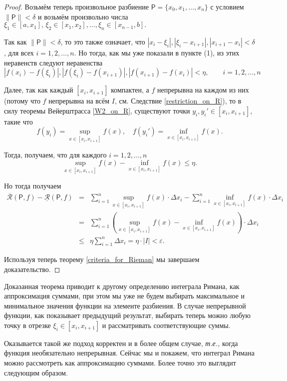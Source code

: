 \begin{proof}
Возьмём теперь произвольное разбиение $\mathsf{P} = \{x_0,x_1,\ldots, x_n\}$ с условием $\|\mathsf{P}\| < \delta$ и возьмём произвольно числа $\xi_1 \in [a,x_1],\, \xi_2 \in [x_1,x_2], \ldots, \xi_n \in [x_{n-1},b].$

Так как $\| \mathsf{P}\| < \delta$, то это также означает, что $|x_i - \xi_i|, |\xi_i-x_{i+1}|, |x_{i+1} - x_i| < \delta$, для всех $i=1,2,\ldots, n$. Но тогда, как мы уже показали в пункте (1), из этих неравенств следуют неравенства 
\[
 |f(x_i) - f(\xi_i)|, |f(\xi_i) - f(x_{i+1})|, |f(x_{i+1}) - f(x_i)| < \eta, \qquad i =1,2, \ldots, n
\]

Далее, так как каждый $[x_i,x_{i+1}]$ компактен, а $f$ непрерывна на каждом из них (потому что $f$ непрерывна на всём $I$, см. Следствие \ref{restriction_on_R}), то в силу теоремы Вейерштрасса \ref{W2_on_R}, существуют точки $y_i,y_i' \in [x_i,x_{i+1}]$, такие что
\[
f(y_i) =  \sup_{x \in [x_i, x_{i+1}]}f(x),\quad f(y_i') = \inf_{x \in [x_i,x_{i+1}]}f(x).
\]

Тогда, получаем, что для каждого $i=1,2,\ldots, n$
\[
 \sup_{x \in [x_i, x_{i+1}]}f(x) - \inf_{x \in [x_i,x_{i+1}]}f(x) \le \eta.
\]

Но тогда получаем
\begin{eqnarray*}
 \overline{\mathcal{R}}(\mathsf{P},f) - \underline{\mathcal{R}}(\mathsf{P},f) &=& \sum_{i=1}^n  \sup_{x \in [x_i, x_{i+1}]}f(x) \cdot \Delta x_i - \sum_{i=1}^n  \inf_{x \in [x_i, x_{i+1}]}f(x) \cdot \Delta x_i \\
 &=& \sum_{i=1}^n \left( \sup_{x \in [x_i, x_{i+1}]}f(x) - \inf_{x \in [x_i, x_{i+1}]}f(x) \right)\cdot \Delta x_i \\
 &\le& \eta \sum_{i=1}^n \Delta x_i = \eta \cdot |I| < \varepsilon.
\end{eqnarray*}

Используя теперь теорему \ref{criteria_for_Rieman} мы завершаем доказательство.
\end{proof}

Доказанная теорема приводит к другому определению интеграла Римана, как аппроксимация суммами, при этом мы уже не будем выбирать максимальное и минимальное значения функции на элементе разбиения. В случае непрерывной функции, как показывает предыдущий результат, выбирать теперь можно любую точку в отрезке $\xi_i \in [x_i, x_{i+1}]$ и рассматривать соответствующие суммы.

Оказывается такой же подход корректен и в более общем случае, \textit{т.е.,} когда функция необязательно непрерывная. Сейчас мы и покажем, что интеграл Римана можно рассмотреть как аппроксимацию суммами. Более точно это выглядит следующим образом.

